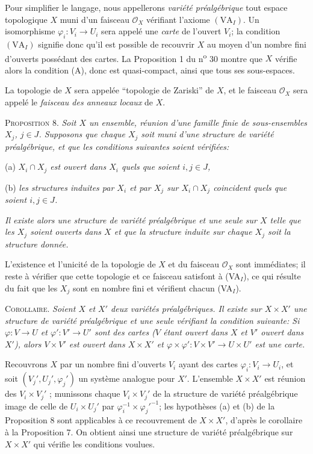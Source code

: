 Pour simplifier le langage, nous appellerons \textit{variété préalgébrique} tout espace topologique $X$ muni d'un faisceau $\mathcal{O}_X$ vérifiant l'axiome $(\mathrm{VA}_I)$. Un isomorphisme $\varphi_i\colon V_i \to U_i$ sera appelé une \textit{carte} de l'ouvert $V_i$; la condition $(\mathrm{VA}_I)$ signifie donc qu'il est possible de recouvrir $X$ au moyen d'un nombre fini d'ouverts possédant des cartes. La Proposition 1 du n\textsuperscript{o} 30 montre que $X$ vérifie alors la condition (A), donc est quasi-compact, ainsi que tous ses sous-espaces.



La topologie de $X$ sera appelée ``topologie de Zariski'' de $X$, et le faisceau $\mathcal{O}_X$ sera appelé le \textit{faisceau des anneaux locaux} de $X$.

\textsc{Proposition} 8. \textit{Soit $X$ un ensemble, réunion d'une famille finie de sous-ensembles $X_j$, $j \in J$. Supposons que chaque $X_j$ soit muni d'une structure de variété préalgébrique, et que les conditions suivantes soient vérifiées:}

(a) \textit{$X_i \cap X_j$ est ouvert dans $X_i$ quels que soient $i, j \in J$,}

(b) \textit{les structures induites par $X_i$ et par $X_j$ sur $X_i \cap X_j$ coincident quels que soient $i, j \in J$.}

\textit{Il existe alors une structure de variété préalgébrique et une seule sur $X$ telle que les $X_j$ soient ouverts dans $X$ et que la structure induite sur chaque $X_j$ soit la structure donnée.}

L'existence et l'unicité de la topologie de $X$ et du faisceau $\mathcal{O}_X$ sont immédiates; il reste à vérifier que cette topologie et ce faisceau satisfont à (VA$_I$), ce qui résulte du fait que les $X_j$ sont en nombre fini et vérifient chacun (VA$_I$).

\textsc{Corollaire}. \textit{Soient $X$ et $X'$ deux variétés préalgébriques. Il existe sur $X \times X'$ une structure de variété préalgébrique et une seule vérifiant la condition suivante: Si $\varphi : V \to U$ et $\varphi' : V' \to U'$ sont des cartes ($V$ étant ouvert dans $X$ et $V'$ ouvert dans $X'$), alors $V \times V'$ est ouvert dans $X \times X'$ et $\varphi \times \varphi' : V \times V' \to U \times U'$ est une carte.}

Recouvrons $X$ par un nombre fini d'ouverts $V_i$ ayant des cartes $\varphi_i : V_i \to U_i$, et soit $(V_j', U_j', \varphi_j')$ un système analogue pour $X'$. L'ensemble $X \times X'$ est réunion des $V_i \times V_j'$ ; munissons chaque $V_i \times V_j'$ de la structure de variété préalgébrique image de celle de $U_i \times U_j'$ par $\varphi_i^{-1} \times {\varphi_j'}^{-1}$; les hypothèses (a) et (b) de la Proposition 8 sont applicables à ce recouvrement de $X \times X'$, d'après le corollaire à la Proposition 7. On obtient ainsi une structure de variété préalgébrique sur $X \times X'$ qui vérifie les conditions voulues.

